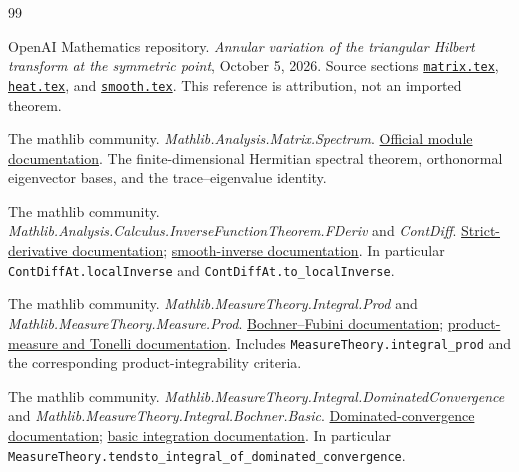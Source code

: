 \documentclass[11pt]{article}
\theoremstyle{remark}\newtheorem{remark}[theorem]{Remark}
\begin{document}
\clearpage
\begin{thebibliography}{99}
OpenAI Mathematics repository. \emph{Annular variation of the triangular Hilbert transform at the symmetric point}, October 5, 2026. Source sections
\href{https://raw.githubusercontent.com/openai/math/main/preprints/Annular-variation-of-the-triangular-Hilbert-transform-at-the-symmetric-point-October-5-2026/build/sections/matrix.tex}{\texttt{matrix.\allowbreak tex}},
\href{https://raw.githubusercontent.com/openai/math/main/preprints/Annular-variation-of-the-triangular-Hilbert-transform-at-the-symmetric-point-October-5-2026/build/sections/heat.tex}{\texttt{heat.\allowbreak tex}}, and
\href{https://raw.githubusercontent.com/openai/math/main/preprints/Annular-variation-of-the-triangular-Hilbert-transform-at-the-symmetric-point-October-5-2026/build/sections/smooth.tex}{\texttt{smooth.\allowbreak tex}}.
This reference is attribution, not an imported theorem.

The mathlib community. \emph{Mathlib.Analysis.Matrix.Spectrum}.
\href{https://leanprover-community.github.io/mathlib4_docs/Mathlib/Analysis/Matrix/Spectrum.html}{Official module documentation}.
The finite-dimensional Hermitian spectral theorem, orthonormal eigenvector bases, and the trace--eigenvalue identity.

The mathlib community. \emph{Mathlib.Analysis.Calculus.InverseFunctionTheorem.FDeriv} and \emph{ContDiff}.
\href{https://leanprover-community.github.io/mathlib4_docs/Mathlib/Analysis/Calculus/InverseFunctionTheorem/FDeriv.html}{Strict-derivative documentation};
\href{https://leanprover-community.github.io/mathlib4_docs/Mathlib/Analysis/Calculus/InverseFunctionTheorem/ContDiff.html}{smooth-inverse documentation}.
In particular \texttt{ContDiffAt.\allowbreak localInverse} and \texttt{ContDiffAt.\allowbreak to\_\allowbreak localInverse}.

The mathlib community. \emph{Mathlib.MeasureTheory.Integral.Prod} and \emph{Mathlib.MeasureTheory.Measure.Prod}.
\href{https://leanprover-community.github.io/mathlib4_docs/Mathlib/MeasureTheory/Integral/Prod.html}{Bochner--Fubini documentation};
\href{https://leanprover-community.github.io/mathlib4_docs/Mathlib/MeasureTheory/Measure/Prod.html}{product-measure and Tonelli documentation}.
Includes \texttt{MeasureTheory.\allowbreak integral\_\allowbreak prod} and the corresponding product-integrability criteria.

The mathlib community. \emph{Mathlib.MeasureTheory.Integral.DominatedConvergence} and \emph{Mathlib.MeasureTheory.Integral.Bochner.Basic}.
\href{https://leanprover-community.github.io/mathlib4_docs/Mathlib/MeasureTheory/Integral/DominatedConvergence.html}{Dominated-convergence documentation};
\href{https://leanprover-community.github.io/mathlib4_docs/Mathlib/MeasureTheory/Integral/Bochner/Basic.html}{basic integration documentation}.
In particular \texttt{MeasureTheory.\allowbreak tendsto\_\allowbreak integral\_\allowbreak of\_\allowbreak dominated\_\allowbreak convergence}.


\end{thebibliography}
\end{document}
